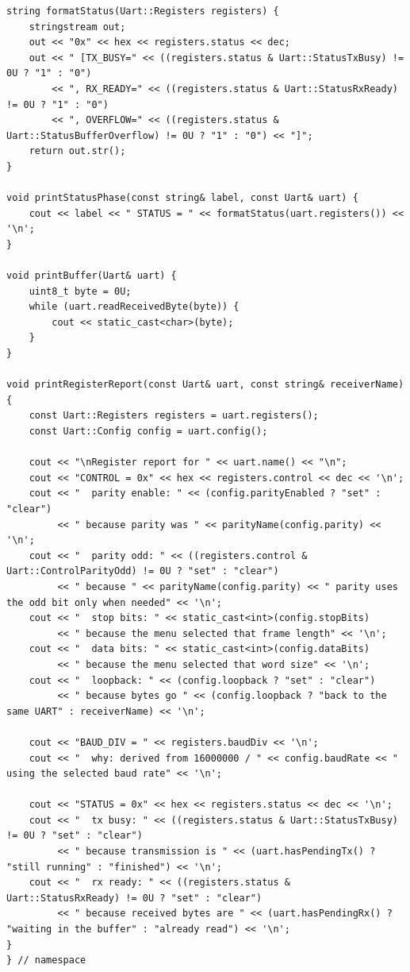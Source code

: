 \documentclass[11pt]{article}
\begin{document}
\begin{lstlisting}[style=code]
string formatStatus(Uart::Registers registers) {
    stringstream out;
    out << "0x" << hex << registers.status << dec;
    out << " [TX_BUSY=" << ((registers.status & Uart::StatusTxBusy) != 0U ? "1" : "0")
        << ", RX_READY=" << ((registers.status & Uart::StatusRxReady) != 0U ? "1" : "0")
        << ", OVERFLOW=" << ((registers.status & Uart::StatusBufferOverflow) != 0U ? "1" : "0") << "]";
    return out.str();
}

void printStatusPhase(const string& label, const Uart& uart) {
    cout << label << " STATUS = " << formatStatus(uart.registers()) << '\n';
}

void printBuffer(Uart& uart) {
    uint8_t byte = 0U;
    while (uart.readReceivedByte(byte)) {
        cout << static_cast<char>(byte);
    }
}

void printRegisterReport(const Uart& uart, const string& receiverName) {
    const Uart::Registers registers = uart.registers();
    const Uart::Config config = uart.config();

    cout << "\nRegister report for " << uart.name() << "\n";
    cout << "CONTROL = 0x" << hex << registers.control << dec << '\n';
    cout << "  parity enable: " << (config.parityEnabled ? "set" : "clear")
         << " because parity was " << parityName(config.parity) << '\n';
    cout << "  parity odd: " << ((registers.control & Uart::ControlParityOdd) != 0U ? "set" : "clear")
         << " because " << parityName(config.parity) << " parity uses the odd bit only when needed" << '\n';
    cout << "  stop bits: " << static_cast<int>(config.stopBits)
         << " because the menu selected that frame length" << '\n';
    cout << "  data bits: " << static_cast<int>(config.dataBits)
         << " because the menu selected that word size" << '\n';
    cout << "  loopback: " << (config.loopback ? "set" : "clear")
         << " because bytes go " << (config.loopback ? "back to the same UART" : receiverName) << '\n';

    cout << "BAUD_DIV = " << registers.baudDiv << '\n';
    cout << "  why: derived from 16000000 / " << config.baudRate << " using the selected baud rate" << '\n';

    cout << "STATUS = 0x" << hex << registers.status << dec << '\n';
    cout << "  tx busy: " << ((registers.status & Uart::StatusTxBusy) != 0U ? "set" : "clear")
         << " because transmission is " << (uart.hasPendingTx() ? "still running" : "finished") << '\n';
    cout << "  rx ready: " << ((registers.status & Uart::StatusRxReady) != 0U ? "set" : "clear")
         << " because received bytes are " << (uart.hasPendingRx() ? "waiting in the buffer" : "already read") << '\n';
}
} // namespace


\end{lstlisting}
\end{document}
